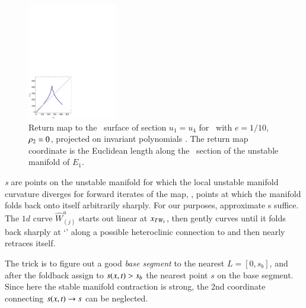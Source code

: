 \begin{figure}[ht]
\begin{center}
\includegraphics[width=0.35\textwidth]{../figs/CLEipRM}
\end{center}
\caption[Return map for Complex Lorenz flow, invariant polynomials]
{Return map to the \Poincare\
surface of section $u_1=u_4$ for \CLe\ with $e=1/10$, $\rho_2=0$,
projected on invariant polynomials \refeq{eq:ipLaser}.
The return map coordinate is the Euclidean
length along the \Poincare\ section of the unstable manifold of $E_1$.
    }
\label{fig:CLEipRM}
\end{figure}

{\em \Turn s} are points on the unstable
manifold for which the local unstable manifold curvature diverges
for forward iterates of the map, \ie, points at which the manifold
folds back onto itself arbitrarily sharply.
For our purposes,
approximate \turn s suffice.
The $1d$ curve $\hat{W}^u_{(j)}$ starts out linear at
$x_{TW_{1}}$, then gently curves until it folds back sharply
at `\turn' along a possible heteroclinic connection to \EQV{0} 
and then nearly retraces itself. 

The trick is to figure out a good {\em base segment} to the
nearest {\turn} $L=[0,s_{b}]$, and after the foldback assign
to $s(x,t)>s_{b}$ the nearest point $s$ on the base
segment. Since here the stable manifold contraction is strong, the
2nd coordinate connecting $s(x,t) \to s$ can be neglected.

